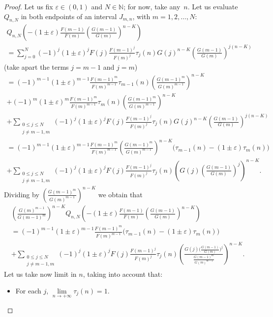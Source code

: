 \documentclass[10pt, a4paper, leqno]{amsart}
\numberwithin{equation}{section}
\theoremstyle{plain}
\theoremstyle{remark}
\newcommand{\NN}{\mathbb{N}}
\newcommand{\eps}{\varepsilon}
\begin{document}
\begin{proof}
Let us fix $\eps \in (0,1)$ and $N \in \NN$; for now, take any~$n$. Let us evaluate $Q_{n,N}$ in both endpoints of an interval $J_{m,n}$, with $m=1,2,\dots,N$:
\begin{multline*}
  Q_{n,N}\left( -(1\pm \eps) \tfrac{F(m-1)}{F(m)} \left( \tfrac{G(m-1)}{G(m)} \right)^{n-K} \right)
  \\
  = \sum_{j=0}^N (-1)^j (1\pm \eps)^j F(j) \tfrac{F(m-1)^j}{F(m)^j}
  \tau_j(n) G(j)^{n-K} \left( \tfrac{G(m-1)}{G(m)} \right)^{j(n-K)}
\end{multline*}
(take apart the terms $j=m-1$ and $j=m$)
\begin{multline*}
  = (-1)^{m-1} (1\pm \eps)^{m-1} \tfrac{F(m-1)^m}{F(m)^{m-1}}
  \tau_{m-1}(n) \left( \tfrac{G(m-1)^m}{G(m)^{m-1}} \right)^{n-K}
  \\
  + (-1)^m (1\pm \eps)^m \tfrac{F(m-1)^m}{F(m)^{m-1}}
  \tau_m(n) \left( \tfrac{G(m-1)^m}{G(m)^{m-1}} \right)^{n-K}
  \\
  + \sum_{\substack{0 \le j \le N \\ j\ne m-1, m}} (-1)^j (1\pm \eps)^j F(j) \tfrac{F(m-1)^j}{F(m)^j}
  \tau_j(n) G(j)^{n-K} \left( \tfrac{G(m-1)}{G(m)} \right)^{j(n-K)}
\\
  = (-1)^{m-1} (1\pm \eps)^{m-1} \tfrac{F(m-1)^m}{F(m)^{m-1}}
  \left( \tfrac{G(m-1)^m}{G(m)^{m-1}} \right)^{n-K}
  \big( \tau_{m-1}(n) - (1 \pm \eps) \tau_m(n) \big)
  \\
  + \sum_{\substack{0 \le j \le N \\ j\ne m-1, m}} (-1)^j (1\pm \eps)^j F(j) \tfrac{F(m-1)^j}{F(m)^j}
  \tau_j(n) \left( G(j) \left(\tfrac{G(m-1)}{G(m)}\right)^j \right)^{n-K}.
\end{multline*}
Dividing by $\left( \tfrac{G(m-1)^m}{G(m)^{m-1}} \right)^{n-K}$ we obtain that
\begin{multline*}
  \left( \tfrac{G(m)^{m-1}}{G(m-1)^m} \right)^{n-K} 
  Q_{n,N}\left( -(1\pm \eps) \tfrac{F(m-1)}{F(m)} \left( \tfrac{G(m-1)}{G(m)} \right)^{n-K} \right)
  \\
  = (-1)^{m-1} (1\pm \eps)^{m-1} \tfrac{F(m-1)^m}{F(m)^{m-1}}
  \big( \tau_{m-1}(n) - (1 \pm \eps) \tau_m(n) \big)
  \\
  + \sum_{\substack{0 \le j \le N \\ j\ne m-1, m}} (-1)^j 
  (1\pm \eps)^j F(j) \tfrac{F(m-1)^j}{F(m)^j}
  \tau_j(n) \left(
  \frac{G(j) \Big(\tfrac{G(m-1)}{G(m)}\Big)^j}
  {\tfrac{G(m-1)^m}{G(m)^{m-1}}}
  \right)^{n-K}.
\end{multline*}
Let us take now limit in $n$, taking into account that:
\begin{itemize}
\item For each $j$, $\lim\limits_{n\to +\infty} \tau_j(n) = 1$.


\end{itemize}
\end{proof}
\end{document}

